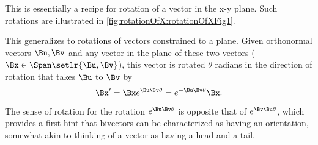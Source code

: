 This is essentially a recipe for rotation of a vector in the x-y plane.
Such rotations are illustrated in \cref{fig:rotationOfX:rotationOfXFig1}.

This generalizes to rotations of  vectors constrained to a plane.
Given orthonormal vectors \( \Bu, \Bv \) and any vector in the plane of these two vectors (\( \Bx \in \Span\setlr{\Bu,\Bv} \)), this vector is rotated \( \theta \) radians in the direction of rotation that takes \( \Bu \) to \( \Bv \) by
\begin{equation}\label{eqn:2dRotations:1160}
\Bx' = \Bx e^{ \Bu \Bv \theta } = e^{-\Bu \Bv \theta} \Bx.
\end{equation}

The sense of rotation for the rotation \( e^{ \Bu \Bv \theta} \) is opposite that of \( e^{\Bv \Bu \theta} \), which provides a first hint that bivectors can be characterized as having an orientation, somewhat akin to thinking of a vector as having a head and a tail.

